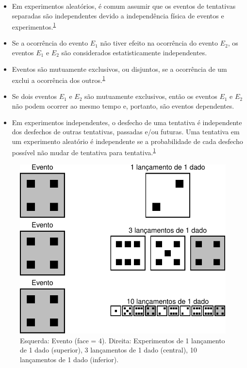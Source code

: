 \documentclass[
  a4paper,
]{book}
\begin{document}
\begin{itemize}
\item
  Em experimentos aleatórios, é comum assumir que os eventos de tentativas separadas são independentes devido a independência física de eventos e experimentos.\textsuperscript{\protect\hyperlink{ref-grami2023}{1}}
\item
  Se a ocorrência do evento \(E_{1}\) não tiver efeito na ocorrência do evento \(E_{2}\), os eventos \(E_{1}\) e \(E_{2}\) são considerados estatisticamente independentes.
\item
  Eventos são mutuamente exclusivos, ou disjuntos, se a ocorrência de um exclui a ocorrência dos outros.\textsuperscript{\protect\hyperlink{ref-grami2023}{1}}
\item
  Se dois eventos \(E_{1}\) e \(E_{2}\) são mutuamente exclusivos, então os eventos \(E_{1}\) e \(E_{2}\) não podem ocorrer ao mesmo tempo e, portanto, são eventos dependentes.
\item
  Em experimentos independentes, o desfecho de uma tentativa é independente dos desfechos de outras tentativas, passadas e/ou futuras. Uma tentativa em um experimento aleatório é independente se a probabilidade de cada desfecho possível não mudar de tentativa para tentativa.\textsuperscript{\protect\hyperlink{ref-grami2023}{1}}
\end{itemize}

\begin{figure}

{\centering \includegraphics{Ciencia-com-R_files/figure-latex/independencia-dado-1} 

}

\caption{Esquerda: Evento (face = 4). Direita: Experimentos de 1 lançamento de 1 dado (superior), 3 lançamentos de 1 dado (central), 10 lançamentos de 1 dado (inferior).}\label{fig:independencia-dado}
\end{figure}
\end{document}
